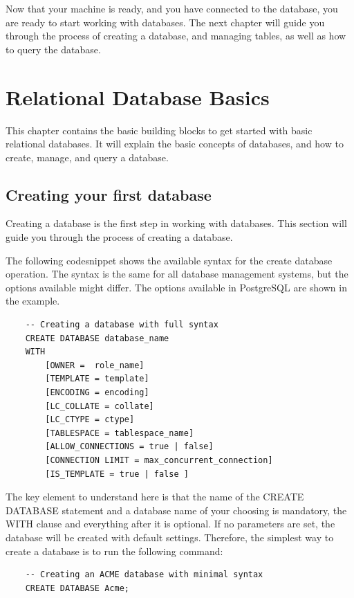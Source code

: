 Now that your machine is ready, and you have connected to the database, you are ready to start working with databases. The next chapter will guide you through the process of creating a database, and managing tables, as well as how to query the database.


\chapter{Relational Database Basics}
\label{chap:relational:relational-database-basics}
This chapter contains the basic building blocks to get started with basic relational databases.
It will explain the basic concepts of databases, and how to create, manage, and query a database.

\section{Creating your first database}
Creating a database is the first step in working with databases. This section will guide you through the process of creating a database. 

The following codesnippet shows the available syntax for the create database operation. The syntax is the same for all database management systems, but the options available might differ. The options available in PostgreSQL are shown in the example.

\begin{verbatim}
    -- Creating a database with full syntax
    CREATE DATABASE database_name
    WITH
        [OWNER =  role_name]
        [TEMPLATE = template]
        [ENCODING = encoding]
        [LC_COLLATE = collate]
        [LC_CTYPE = ctype]
        [TABLESPACE = tablespace_name]
        [ALLOW_CONNECTIONS = true | false]
        [CONNECTION LIMIT = max_concurrent_connection]
        [IS_TEMPLATE = true | false ]
\end{verbatim}

The key element to understand here is that the name of the CREATE DATABASE statement and a database name of your choosing is mandatory, the WITH clause and everything after it is optional. If no parameters are set, the database will be created with default settings. Therefore, the simplest way to create a database is to run the following command:

\begin{verbatim}
    -- Creating an ACME database with minimal syntax
    CREATE DATABASE Acme;
\end{verbatim}

